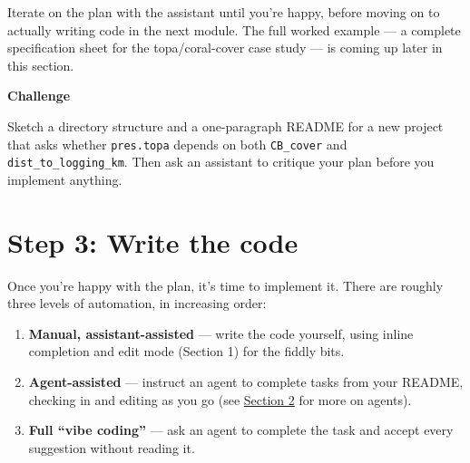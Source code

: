 \documentclass[
  letterpaper,
  DIV=11,
  numbers=noendperiod]{scrreprt}
\providecommand{\tightlist}{%
  \setlength{\itemsep}{0pt}\setlength{\parskip}{0pt}}
\begin{document}
Iterate on the plan with the assistant until you're happy, before moving
on to actually writing code in the next module. The full worked example
--- a complete specification sheet for the topa/coral-cover case study
--- is coming up later in this section.

\begin{tcolorbox}[enhanced jigsaw, toprule=.15mm, rightrule=.15mm, left=2mm, leftrule=.75mm, breakable, opacityback=0, arc=.35mm, colframe=quarto-callout-important-color-frame, bottomrule=.15mm, colback=white]
\begin{minipage}[t]{5.5mm}
\textcolor{quarto-callout-important-color}{\faExclamation}
\end{minipage}%
\begin{minipage}[t]{\textwidth - 5.5mm}

\vspace{-3mm}\textbf{Challenge}\vspace{3mm}

Sketch a directory structure and a one-paragraph README for a new
project that asks whether \texttt{pres.topa} depends on both
\texttt{CB\_cover} and \texttt{dist\_to\_logging\_km}. Then ask an
assistant to critique your plan before you implement anything.

\end{minipage}%
\end{tcolorbox}

\chapter{Step 3: Write the code}\label{step-3-write-the-code}

Once you're happy with the plan, it's time to implement it. There are
roughly three levels of automation, in increasing order:

\begin{enumerate}
\def\labelenumi{\arabic{enumi}.}
\tightlist
\item
  \textbf{Manual, assistant-assisted} --- write the code yourself, using
  inline completion and edit mode (Section 1) for the fiddly bits.
\item
  \textbf{Agent-assisted} --- instruct an agent to complete tasks from
  your README, checking in and editing as you go (see
  \hyperref[section-2-agents]{Section 2} for more on agents).
\item
  \textbf{Full ``vibe coding''} --- ask an agent to complete the task
  and accept every suggestion without reading it.
\end{enumerate}
\end{document}

